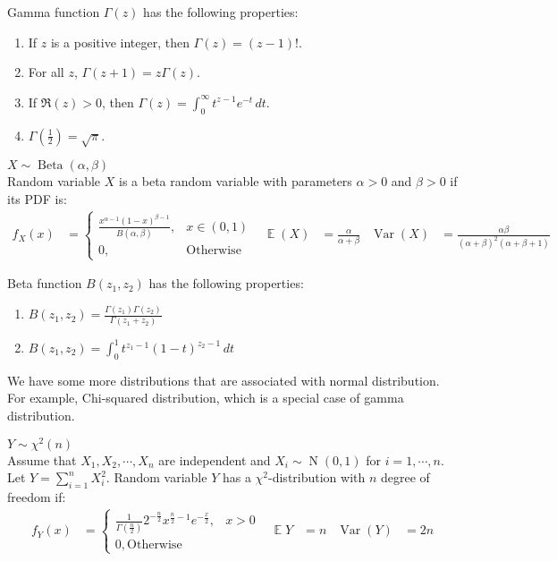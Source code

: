 \documentclass{huhtakm-template-book-v2}
\DeclareMathOperator{\E}{\mathbb{E}}
\DeclareMathOperator{\Var}{Var}
\DeclareMathOperator{\N}{N}
\DeclareMathOperator{\Bet}{Beta}
\begin{document}
\begin{rem}
	Gamma function $\Gamma(z)$ has the following properties:
	\begin{enumerate}
		\item If $z$ is a positive integer, then $\Gamma(z)=(z-1)!$.
		\item For all $z$, $\Gamma(z+1)=z\Gamma(z)$.
		\item If $\Re(z)>0$, then $\Gamma(z)=\int_{0}^{\infty}t^{z-1}e^{-t}\,dt$.
		\item $\Gamma(\frac{1}{2})=\sqrt{\pi}$.
	\end{enumerate}
\end{rem}
\begin{eg} $X\sim\Bet(\alpha,\beta)$\\
	Random variable $X$ is a beta random variable with parameters $\alpha>0$ and $\beta>0$ if its PDF is: 
	\begin{align*}
		f_{X}(x)&=\begin{cases}
			\frac{x^{\alpha-1}(1-x)^{\beta-1}}{B(\alpha,\beta)}, &x\in(0,1)\\
			0, &\text{Otherwise}
		\end{cases} & \E(X)&=\frac{\alpha}{\alpha+\beta} & \Var(X)&=\frac{\alpha\beta}{(\alpha+\beta)^{2}(\alpha+\beta+1)}
	\end{align*}
\end{eg}
\begin{rem}
	Beta function $B(z_{1},z_{2})$ has the following properties:
	\begin{enumerate}
		\item $B(z_{1},z_{2})=\frac{\Gamma(z_{1})\Gamma(z_{2})}{\Gamma(z_{1}+z_{2})}$
		\item $B(z_{1},z_{2})=\int_{0}^{1}t^{z_{1}-1}(1-t)^{z_{2}-1}\,dt$
	\end{enumerate}
\end{rem}
We have some more distributions that are associated with normal distribution. For example, Chi-squared distribution, which is a special case of gamma distribution.
\begin{eg} $Y\sim\chi^{2}(n)$\\
	Assume that $X_{1},X_{2},\cdots,X_{n}$ are independent and $X_{i}\sim\N(0,1)$ for $i=1,\cdots,n$. Let $Y=\sum_{i=1}^{n}X_{i}^{2}$. Random variable $Y$ has a $\chi^{2}$-distribution with $n$ degree of freedom if:
	\begin{align*}
		f_{Y}(x)&=\begin{cases}
			\frac{1}{\Gamma(\frac{n}{2})}2^{-\frac{n}{2}}x^{\frac{n}{2}-1}e^{-\frac{x}{2}}, &x>0\\
			0, \text{Otherwise}
		\end{cases} & \E{Y}&=n & \Var(Y)&=2n
	\end{align*}
\end{eg} 
\end{document}
